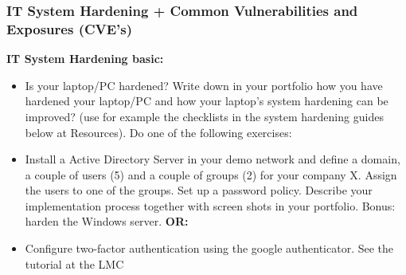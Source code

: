 \documentclass[12pt, letterpaper]{article}
\begin{document}
\subsubsection{IT System Hardening + Common Vulnerabilities and Exposures (CVE's)}
\textbf{IT System Hardening basic:}
\begin{itemize}
    \item Is your laptop/PC hardened? Write down in your portfolio how you have hardened your laptop/PC and how your laptop's system hardening can be improved? (use for example the checklists in the system hardening guides below at Resources).
    Do one of the following exercises:
    \item Install a Active Directory Server in your demo network and define a domain, a couple of users (5) and a couple of groups (2) for your company X. Assign the users to one of the groups. Set up a password policy. Describe your implementation process together with screen shots in your portfolio. Bonus: harden the Windows server. \textbf{OR:}
    \item Configure two-factor authentication using the google authenticator. See the tutorial at the LMC
\end{itemize}
\hfill\break
\hfill\break
\end{document}
